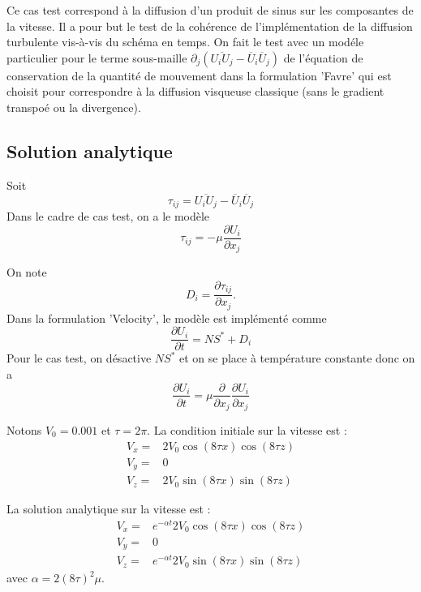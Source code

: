 Ce cas test correspond \`a la diffusion d'un produit de sinus sur les composantes de la vitesse. Il a pour but le test de la coh\'erence de l'impl\'ementation de la diffusion turbulente vis-\`a-vis du sch\'ema en temps. On fait le test avec un mod\'ele particulier pour le terme sous-maille $\partial_j\left(\overline{U_i U_j} - \overline{U}_i\overline{U}_j\right)$ de l'\'equation de conservation de la quantit\'e de mouvement dans la formulation 'Favre' qui est choisit pour correspondre \`a la diffusion visqueuse classique (sans le gradient transpo\'e ou la divergence).

\subsection{Solution analytique}

Soit
\begin{equation}
\tau_{ij} = \overline{U_i U_j} - \overline{U}_i\overline{U}_j
\end{equation}
Dans le cadre de cas test, on a le mod\`ele
\begin{equation}
\tau_{ij} = - \mu \frac{\partial U_i}{\partial x_j}
\end{equation}

On note
\begin{equation}
D_i = \frac{\partial \tau_{ij}}{\partial x_j}.
\end{equation}
Dans la formulation 'Velocity', le mod\`ele est impl\'ement\'e comme
\begin{equation}
\frac{\partial U_{i}}{\partial t} = NS^* + D_i
\end{equation}
Pour le cas test, on d\'esactive $NS^*$ et on se place \`a temp\'erature constante donc on a
\begin{equation}
\frac{\partial U_{i}}{\partial t} = \mu \frac{\partial}{\partial x_j} \frac{\partial U_i}{\partial x_j}
\end{equation}

Notons $V_0 = 0.001$ et $\tau=2\pi$.
La condition initiale sur la vitesse est :
\begin{align*}
V_x ={}& 2 V_0 \cos(8 \tau x) \cos(8 \tau z) \\
V_y ={}& 0 \\
V_z ={}& 2 V_0 \sin(8 \tau x) \sin(8 \tau z)
\end{align*}

La solution analytique sur la vitesse est :
\begin{align*}
V_x ={}& e^{-\alpha t} 2 V_0 \cos(8 \tau x) \cos(8 \tau z) \\
V_y ={}& 0 \\
V_z ={}& e^{-\alpha t} 2 V_0 \sin(8 \tau x) \sin(8 \tau z)
\end{align*}
avec $\alpha = 2 (8\tau)^2 \mu$.

